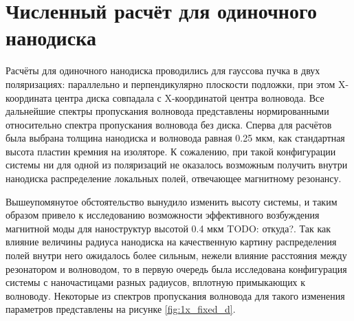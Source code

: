 \section{Численный расчёт для одиночного нанодиска}

Расчёты для одиночного нанодиска проводились для гауссова пучка в двух поляризациях: параллельно и перпендикулярно плоскости подложки, при этом X-координата центра диска совпадала с X-координатой центра волновода. Все дальнейшие спектры пропускания волновода представлены нормированными относительно спектра пропускания волновода без диска. Сперва для расчётов была выбрана толщина нанодиска и волновода равная 0.25 мкм, как стандартная высота пластин кремния на изоляторе. К сожалению, при такой конфигурации системы ни для одной из поляризаций не оказалось возможным получить внутри нанодиска распределение локальных полей, отвечающее магнитному резонансу. 

Вышеупомянутое обстоятельство вынудило изменить высоту системы, и таким образом привело к исследованию возможности эффективного возбуждения магнитной моды для наноструктур высотой 0.4 мкм TODO: откуда?. Так как влияние величины радиуса нанодиска на качественную картину распределения полей внутри него ожидалось более сильным, нежели влияние расстояния между резонатором и волноводом, то в первую очередь была исследована конфигурация системы с наночастицами разных радиусов, вплотную примыкающих к волноводу. Некоторые из спектров пропускания волновода для такого изменения параметров представлены на рисунке \ref{fig:1x_fixed_d}.

